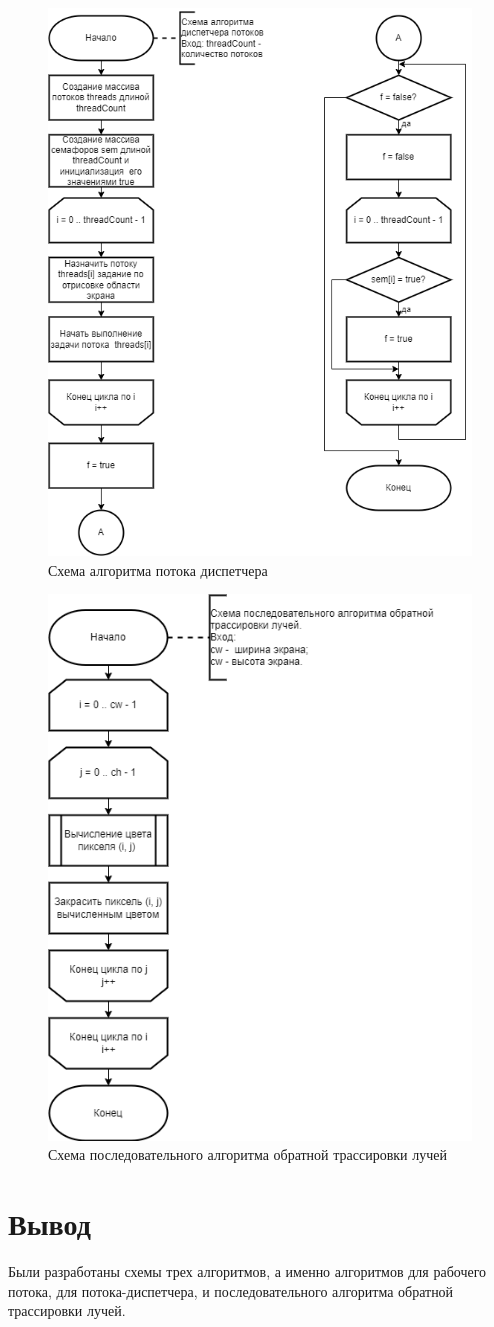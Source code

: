 \begin{figure}[H]
	\centering
	\includegraphics[width=0.7\linewidth]{inc/img/dispatcher}
	\caption{Схема алгоритма потока диспетчера}
	\label{fig:dispatcher}
\end{figure}
\captionsetup{justification=centering,singlelinecheck=true}
\begin{figure}[H]
	\centering
	\includegraphics[width=0.7\linewidth]{inc/img/follow}
	\caption{Схема последовательного алгоритма обратной трассировки лучей}
	\label{fig:follow}
\end{figure}



\section*{Вывод}

Были разработаны схемы трех алгоритмов, а именно алгоритмов для рабочего потока, для потока-диспетчера, и последовательного алгоритма обратной трассировки лучей.


